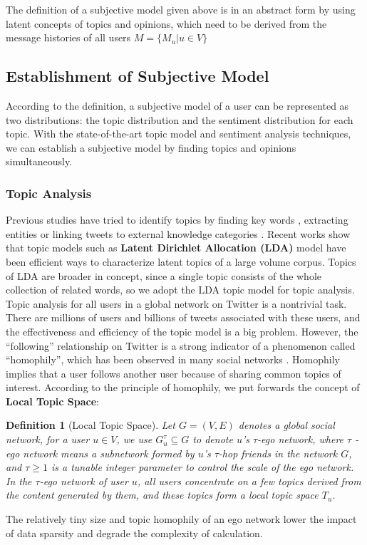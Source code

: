 \documentclass[letterpaper]{article}
\newtheorem{definition}{Definition}
\begin{document}
The definition of a subjective model given above is in an abstract form by using latent concepts of topics and opinions,  which need to be derived from the message histories of all users $ M=\lbrace M_{u}\vert u \in V\rbrace$  

\subsection{Establishment of Subjective Model}
\label{establishment}
According to the definition, a subjective model of a user can be represented as two distributions: the topic distribution and the sentiment distribution for each topic. 
With the state-of-the-art topic model and sentiment analysis techniques, we can establish a subjective model by finding topics and opinions simultaneously. 
\subsubsection{Topic Analysis}
\label{topic}
Previous studies have tried to identify topics by finding key words \cite{Chen:2010STE}, extracting  entities \cite{Abel:2011AUM} or linking tweets to external knowledge categories \cite{conf/icwsm/MacskassyM11}. Recent works show that topic models such as \textbf{Latent Dirichlet Allocation (LDA)} model \cite{blei2003latent} have been efficient ways to characterize latent topics of a large volume corpus.  
Topics of LDA are broader in concept, since a single topic consists of the whole collection of related words, so we adopt the LDA topic model for topic analysis.  
Topic analysis for all users in a global network on Twitter is a nontrivial task. 
There are millions of users and billions of tweets associated with these users, and the effectiveness and efficiency of the topic model is a big problem.
However, the ``following'' relationship on Twitter is a strong indicator of a phenomenon called ``homophily'', which has been observed in many social networks \cite{mcpherson2001birds}.
Homophily implies that a user follows another user because of sharing common topics of interest. 
According to the principle of homophily, we put forwards the concept of \textbf{Local Topic Space}: 
\begin{definition}[Local Topic Space]
\label{local}
Let $G=\left( V,E \right) $ denotes a global social network, for a user $ u \in V $, we use $ G_{u}^{\tau} \subseteq G$ 
to denote $ u $'s $ \tau $-ego network, where $ \tau $ -ego network means a subnetwork formed by $ u $'s $ \tau $-hop 
friends in the network $ G $, and $ \tau \geqslant 1 $ is a tunable integer parameter to control the scale of the ego network. 
In the $ \tau $-ego network of user $ u $, all users concentrate on a few topics derived from the content generated by them, and these topics form a local topic space $ T_{u} $.
\end{definition}
The relatively tiny size and topic homophily of an ego network lower the impact of data sparsity and degrade the complexity of calculation.
\end{document}
